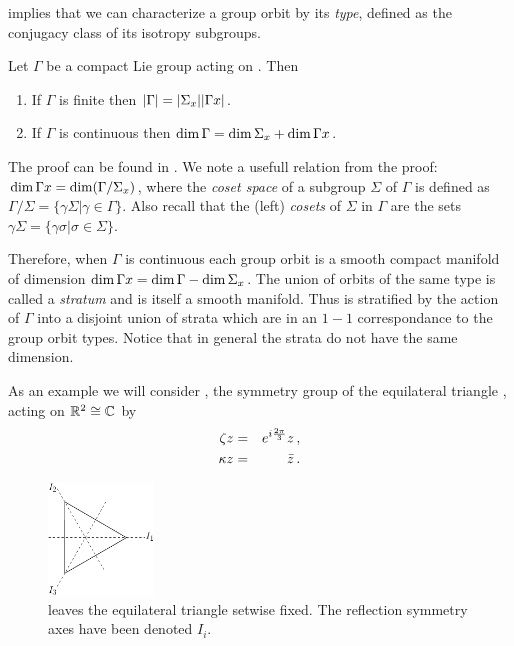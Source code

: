  implies that we can characterize a group orbit by its \emph{type}, defined
as the conjugacy class of its isotropy subgroups.

\begin{proposition}
 Let $\Gamma$ be a compact Lie group acting on . Then
 \begin{enumerate}
  \item If $\Gamma$ is finite then $|\Gamma|=|\Sigma_x||\Gamma x|$.
  \item If $\Gamma$ is continuous then $\dim \Gamma = \dim \Sigma_x+\dim \Gamma x$.
 \end{enumerate}
\end{proposition}
The proof can be found in . We note a usefull relation from the proof: $\dim\Gamma x =\dim(\Gamma/\Sigma_x)$, where the \emph{coset space} of a subgroup $\Sigma$  of $\Gamma$ is defined as $\Gamma/\Sigma=\{\gamma\Sigma|\gamma\in\Gamma\}$. Also recall that the (left) \emph{cosets} of $\Sigma$ in $\Gamma$ are the sets $\gamma\Sigma=\{\gamma\sigma|\sigma\in\Sigma\}$.

Therefore, when $\Gamma$ is continuous each group orbit is a smooth compact manifold of dimension
$\dim \Gamma x=\dim \Gamma-\dim \Sigma_x$. The union of orbits of the same type is called a \emph{stratum}
and is itself a smooth manifold. Thus  is stratified by the action of $\Gamma$ into
a disjoint union of strata which are in an $1-1$ correspondance to the group orbit types. Notice that in general
the strata do not have the same dimension.

As an example we will consider , the symmetry group of the equilateral triangle , acting on $\mathbb{R}^{2}\cong\mathbb{C}^{}$ by
\begin{eqnarray*}
  \zeta z &=& e^{i\frac{2\pi}{3}} z\,,\\
  \kappa z  &=& \bar{z}\,.
\end{eqnarray*}

\begin{figure}
\begin{center}
		\includegraphics[width=0.25\textwidth]{figs/D3triangle}
\end{center}
\caption[D3 symmetry illustration.]{
    {\small
     leaves the equilateral triangle setwise fixed. The reflection symmetry axes have been denoted $I_i$.}}
\label{fig:D3triangle}
    \vspace*{-5pt}
\end{figure}

